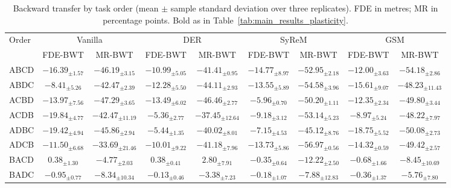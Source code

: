 \begin{table}[!t]
\centering
\caption{Backward transfer by task order (mean $\pm$ sample standard deviation over three replicates). FDE in metres; MR in percentage points. Bold as in Table~\ref{tab:main_results_plasticity}.}
\label{tab:main_results_stability}
\setlength{\tabcolsep}{3.5pt}
\renewcommand{\arraystretch}{1.0}
\fontsize{7}{7.7}\selectfont
\begin{tabular*}{\textwidth}{@{\extracolsep{\fill}}lcccccccc}
\toprule
Order & \multicolumn{2}{c}{Vanilla} & \multicolumn{2}{c}{DER} & \multicolumn{2}{c}{SyReM} & \multicolumn{2}{c}{GSM} \\
\cmidrule(lr){2-3}\cmidrule(lr){4-5}\cmidrule(lr){6-7}\cmidrule(lr){8-9}
 & FDE-BWT & MR-BWT & FDE-BWT & MR-BWT & FDE-BWT & MR-BWT & FDE-BWT & MR-BWT \\
\midrule
ABCD & $-16.39_{\pm1.57}$ & $-46.19_{\pm3.15}$ & $-10.99_{\pm5.05}$ & $-41.41_{\pm0.95}$ & $-14.77_{\pm8.97}$ & $-52.95_{\pm2.18}$ & $-12.00_{\pm3.63}$ & $-54.18_{\pm2.86}$ \\
ABDC & $-8.41_{\pm5.26}$ & $-42.47_{\pm2.39}$ & $-12.28_{\pm5.50}$ & $-44.11_{\pm2.93}$ & $-13.55_{\pm5.89}$ & $-54.58_{\pm3.96}$ & $-15.61_{\pm9.07}$ & $-48.23_{\pm11.43}$ \\
ACBD & $-13.97_{\pm7.56}$ & $-47.29_{\pm3.65}$ & $-13.49_{\pm6.02}$ & $-46.46_{\pm2.77}$ & $-5.96_{\pm0.70}$ & $-50.20_{\pm1.11}$ & $-12.35_{\pm2.34}$ & $-49.80_{\pm3.44}$ \\
ACDB & {\boldmath$-19.84_{\pm4.77}$} & $-42.47_{\pm11.19}$ & $-5.36_{\pm2.77}$ & $-37.45_{\pm12.64}$ & $-9.18_{\pm3.12}$ & $-53.14_{\pm5.23}$ & $-8.97_{\pm5.24}$ & $-48.22_{\pm7.97}$ \\
ADBC & $-19.42_{\pm4.94}$ & $-45.86_{\pm2.94}$ & $-5.44_{\pm1.35}$ & $-40.02_{\pm8.01}$ & $-7.15_{\pm4.53}$ & $-45.12_{\pm8.76}$ & $-18.75_{\pm5.52}$ & {\boldmath$-50.08_{\pm2.73}$} \\
ADCB & $-11.50_{\pm6.68}$ & $-33.69_{\pm21.46}$ & $-10.01_{\pm9.22}$ & $-41.18_{\pm7.96}$ & $-13.73_{\pm5.86}$ & {\boldmath$-56.97_{\pm0.56}$} & $-14.32_{\pm0.59}$ & $-49.42_{\pm2.57}$ \\
BACD & $0.38_{\pm1.30}$ & $-4.77_{\pm2.03}$ & $0.38_{\pm0.41}$ & $2.80_{\pm7.91}$ & $-0.35_{\pm0.64}$ & $-12.22_{\pm2.50}$ & $-0.68_{\pm1.66}$ & $-8.45_{\pm10.69}$ \\
BADC & $-0.95_{\pm0.77}$ & $-8.34_{\pm10.34}$ & $-0.13_{\pm0.46}$ & $-3.38_{\pm7.23}$ & $-0.18_{\pm1.07}$ & $-7.88_{\pm12.83}$ & $-0.36_{\pm1.37}$ & $-5.76_{\pm7.80}$ \\

\end{tabular*}
\end{table}
